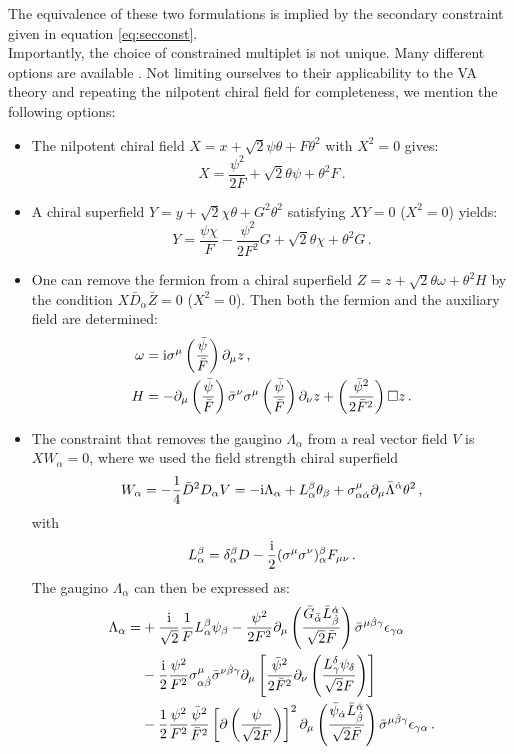 \documentclass[a4paper,12pt,twoside,openright]{report}
\newcommand{\be}{\begin{equation}}
\newcommand{\ee}{\end{equation}}
\newcommand{\bea}{\begin{equation}\begin{aligned}}
\newcommand{\eea}{\end{aligned}\end{equation}}
\def\rmi{{\rm i}}
\begin{document}
The equivalence of these two formulations is implied by the secondary constraint given in equation \eqref{eq:secconst}.\\
Importantly, the choice of constrained multiplet is not unique. Many different options are available \cite{Bandos:2016xyu,GarciadelMoral:2017vnz}. Not limiting ourselves to their applicability to the VA theory and repeating the nilpotent chiral field for completeness, we mention the following options:
\begin{itemize}
\item The nilpotent chiral field $X = x + \sqrt{2} \psi \theta + F \theta^2$ with $X^2=0$ gives:
\be 
X = \frac{\psi^2}{2F} + \sqrt{2}\theta \psi + \theta^2 F\,.
\ee
\item A chiral superfield $Y = y + \sqrt{2} \chi \theta + G^2 \theta^2$ satisfying $XY=0$ ($X^ 2 = 0$) yields: 
\be
Y = \frac{\psi \chi}{F} - \frac{\psi^2}{2F^2} G + \sqrt{2}\theta \chi + \theta^2 G\,.
\ee
\item One can remove the fermion from a chiral superfield $Z = z + \sqrt{2} \theta \omega + \theta^2 H$ by the condition $X \bar{D}_{\dot{\alpha}} \bar{Z}=0$ ($X^ 2=0$). Then both the fermion and the auxiliary field are determined:
\bea 
\omega &= \rmi \sigma^\mu \left(\frac{\bar{\psi}}{\bar{F}}\right) \partial_\mu z\,,\\
H &= -\partial_\mu \left(\frac{\bar{\psi}}{\bar{F}}\right) \bar{\sigma}^\nu \sigma^\mu \left(\frac{\bar{\psi}}{\bar{F}}\right) \partial_\nu z + \left(\frac{\bar{\psi}^2}{2\bar{F}^2}\right) \square z\,.
\eea
\item The constraint that removes the gaugino $\Lambda_\alpha$ from a real vector field $V$ is $X W_\alpha = 0$, where we used the field strength chiral superfield
\be 
W_\alpha = -\frac{1}{4} \bar{D}^2 D_\alpha V = - \rmi \Lambda_\alpha + L^\beta_\alpha \theta_\beta + \sigma^\mu_{\alpha\dot{\alpha}} \partial_\mu \bar{\Lambda}^{\dot{\alpha}} \theta^2\,,
\ee
with
\be 
L_\alpha^\beta = \delta^\beta_\alpha D - \frac{\rmi}{2} (\sigma^\mu \sigma^\nu)^\beta_\alpha F_{\mu\nu}\,.
\ee
The gaugino $\Lambda_\alpha$ can then be expressed as:
\bea
\Lambda_\alpha = & + \frac{\rmi}{\sqrt{2}}\frac{1}{F} L_\alpha^\beta \psi_\beta - \frac{\psi^2}{2F^2} \partial_\mu  \left( \frac{\bar{G}_{\bar{\dot{\alpha}}} \bar{L}^{\dot{\alpha}}_{\dot{\beta}}}{\sqrt{2} \bar{F}} \right) \bar{\sigma}^{\mu \dot{\beta}\gamma} \epsilon_{\gamma\alpha}\\
& - \frac{\rmi}{2} \frac{\psi^2}{F^2} \sigma^\mu_{\alpha \dot{\beta}} \bar{\sigma}^{\nu\dot{\beta}\gamma} \partial_\mu \left[ \frac{\bar{\psi}^2}{2 \bar{F}^2} \partial_\nu \left(\frac{L^\delta_\gamma \psi_\delta}{\sqrt{2} F}\right)\right]\\
& - \frac{1}{2} \frac{\psi^2}{F^2} \frac{\bar{\psi}^2}{\bar{F}^2} \left[\partial \left(\frac{\psi}{\sqrt{2}F}\right)\right]^2\partial_\mu \left(\frac{\bar{\psi}_{\dot{\alpha}} \bar{L}^{\dot{\alpha}}_{\dot{\beta}}}{\sqrt{2} \bar{F}}\right) \bar{\sigma}^{\mu\dot{\beta}\gamma} \epsilon_{\gamma \alpha}\,.
\eea
\end{itemize}
\end{document}
